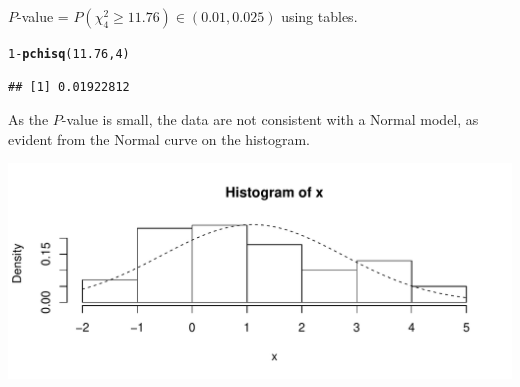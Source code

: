 \documentclass[t,xcolor=pdftex,dvipsnames,table]{beamer}\usepackage[]{graphicx}\usepackage[]{color}
\makeatletter
\def\maxwidth{ %
  \ifdim\Gin@nat@width>\linewidth
    \linewidth
  \else
    \Gin@nat@width
  \fi
}
\newcommand{\hlnum}[1]{\textcolor[rgb]{0.686,0.059,0.569}{#1}}%
\newcommand{\hlopt}[1]{\textcolor[rgb]{0,0,0}{#1}}%
\newcommand{\hlstd}[1]{\textcolor[rgb]{0.345,0.345,0.345}{#1}}%
\newcommand{\hlkwd}[1]{\textcolor[rgb]{0.737,0.353,0.396}{\textbf{#1}}}%
\newenvironment{kframe}{%
 \def\at@end@of@kframe{}%
 \ifinner\ifhmode%
  \def\at@end@of@kframe{\end{minipage}}%
  \begin{minipage}{\columnwidth}%
 \fi\fi%
 \def\FrameCommand##1{\hskip\@totalleftmargin \hskip-\fboxsep
 \colorbox{shadecolor}{##1}\hskip-\fboxsep
     \hskip-\linewidth \hskip-\@totalleftmargin \hskip\columnwidth}%
 \MakeFramed {\advance\hsize-\width
   \@totalleftmargin\z@ \linewidth\hsize
   \@setminipage}}%
 {\par\unskip\endMakeFramed%
 \at@end@of@kframe}
\newenvironment{knitrout}{}{} %
\makeatother
\begin{document}
\begin{frame}[fragile]{}
 $P$-value = $P( \chi^2_{4} \geq 11.76) \in (0.01,0.025) $ using tables.

\begin{knitrout}
\color{fgcolor}\begin{kframe}
\begin{alltt}
\hlnum{1}\hlopt{-}\hlkwd{pchisq}\hlstd{(}\hlnum{11.76}\hlstd{,}\hlnum{4}\hlstd{)}
\end{alltt}
\begin{verbatim}
## [1] 0.01922812
\end{verbatim}
\end{kframe}
\end{knitrout}

 As the $P$-value is small, the data are not consistent with a Normal model, as evident from the Normal curve on the histogram.


\begin{knitrout}
\color{fgcolor}
\includegraphics[width=\maxwidth]{figure/unnamed-chunk-165-1} 

\end{knitrout}

\end{frame} 
\end{document}
